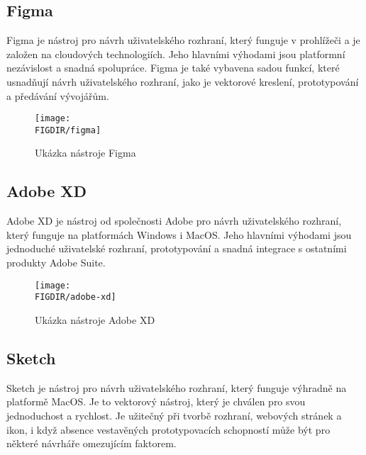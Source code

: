 \subsection{Figma}
\label{subsec:navrh-ui-nastroje-figma}
Figma je nástroj pro návrh uživatelského rozhraní, který funguje v prohlížeči a je založen na cloudových technologiích.
Jeho hlavními výhodami jsou platformní nezávislost a snadná spolupráce.
Figma je také vybavena sadou funkcí, které usnadňují návrh uživatelského rozhraní, jako je vektorové kreslení, prototypování a předávání vývojářům.
\cite{figma}

\begin{figure}[H]
    \centering
    \texttt{[image: \\FIGDIR/figma]}
    \caption{Ukázka nástroje Figma\cite{figma}}
    \label{fig:figma}
\end{figure}

\subsection{Adobe XD}
\label{subsec:navrh-ui-nastroje-adobe-xd}
Adobe XD je nástroj od společnosti Adobe pro návrh uživatelského rozhraní, který funguje na platformách Windows i MacOS.
Jeho hlavními výhodami jsou jednoduché uživatelské rozhraní, prototypování a snadná integrace s ostatními produkty Adobe Suite.
\cite{adobe-xd}

\begin{figure}[H]
    \centering
    \texttt{[image: \\FIGDIR/adobe-xd]}
    \caption{Ukázka nástroje Adobe XD\cite{adobe-xd}}
    \label{fig:adobe-xd}
\end{figure}

\subsection{Sketch}
\label{subsec:navrh-ui-nastroje-sketch}
Sketch je nástroj pro návrh uživatelského rozhraní, který funguje výhradně na platformě MacOS.
Je to vektorový nástroj, který je chválen pro svou jednoduchost a rychlost.
Je užitečný při tvorbě rozhraní, webových stránek a ikon, i když absence vestavěných prototypovacích schopností může být pro některé návrháře omezujícím faktorem.
\cite{sketch}

